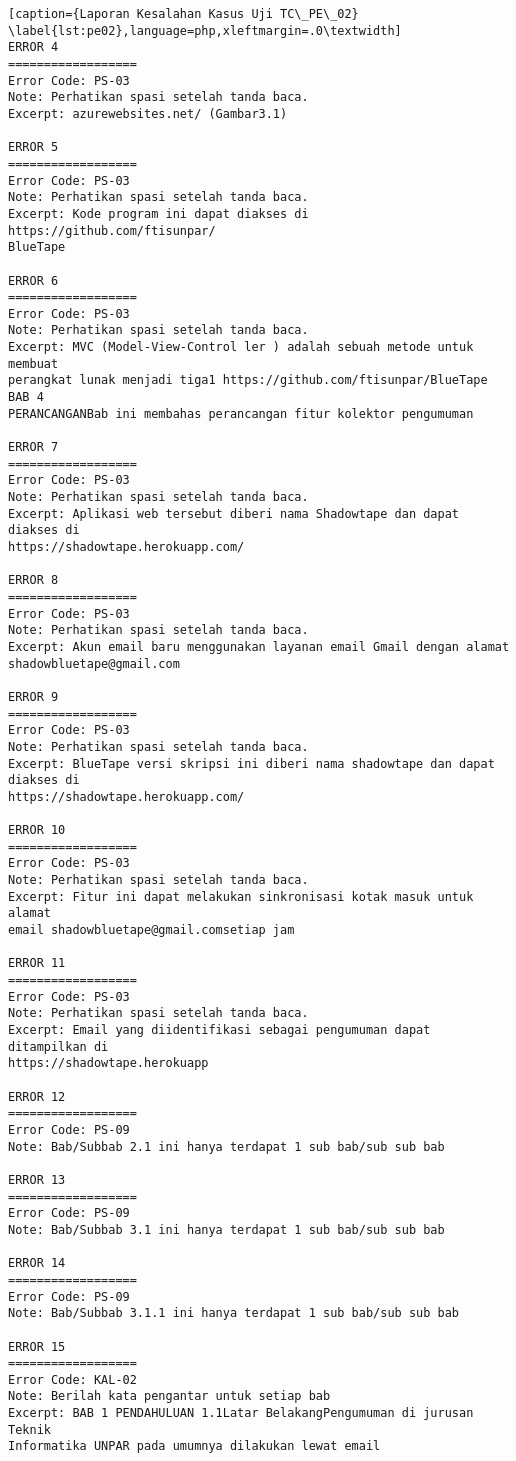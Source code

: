 \begin{enumerate}
\begin{lstlisting}[caption={Laporan Kesalahan Kasus Uji TC\_PE\_02}	\label{lst:pe02},language=php,xleftmargin=.0\textwidth]
ERROR 4
==================
Error Code: PS-03
Note: Perhatikan spasi setelah tanda baca.
Excerpt: azurewebsites.net/ (Gambar3.1)

ERROR 5
==================
Error Code: PS-03
Note: Perhatikan spasi setelah tanda baca.
Excerpt: Kode program ini dapat diakses di https://github.com/ftisunpar/
BlueTape 

ERROR 6
==================
Error Code: PS-03
Note: Perhatikan spasi setelah tanda baca.
Excerpt: MVC (Model-View-Control ler ) adalah sebuah metode untuk membuat 
perangkat lunak menjadi tiga1 https://github.com/ftisunpar/BlueTape BAB 4 
PERANCANGANBab ini membahas perancangan fitur kolektor pengumuman

ERROR 7
==================
Error Code: PS-03
Note: Perhatikan spasi setelah tanda baca.
Excerpt: Aplikasi web tersebut diberi nama Shadowtape dan dapat diakses di 
https://shadowtape.herokuapp.com/ 

ERROR 8
==================
Error Code: PS-03
Note: Perhatikan spasi setelah tanda baca.
Excerpt: Akun email baru menggunakan layanan email Gmail dengan alamat 
shadowbluetape@gmail.com

ERROR 9
==================
Error Code: PS-03
Note: Perhatikan spasi setelah tanda baca.
Excerpt: BlueTape versi skripsi ini diberi nama shadowtape dan dapat diakses di 
https://shadowtape.herokuapp.com/

ERROR 10
==================
Error Code: PS-03
Note: Perhatikan spasi setelah tanda baca.
Excerpt: Fitur ini dapat melakukan sinkronisasi kotak masuk untuk alamat 
email shadowbluetape@gmail.comsetiap jam

ERROR 11
==================
Error Code: PS-03
Note: Perhatikan spasi setelah tanda baca.
Excerpt: Email yang diidentifikasi sebagai pengumuman dapat ditampilkan di 
https://shadowtape.herokuapp

ERROR 12
==================
Error Code: PS-09
Note: Bab/Subbab 2.1 ini hanya terdapat 1 sub bab/sub sub bab

ERROR 13
==================
Error Code: PS-09
Note: Bab/Subbab 3.1 ini hanya terdapat 1 sub bab/sub sub bab

ERROR 14
==================
Error Code: PS-09
Note: Bab/Subbab 3.1.1 ini hanya terdapat 1 sub bab/sub sub bab

ERROR 15
==================
Error Code: KAL-02
Note: Berilah kata pengantar untuk setiap bab
Excerpt: BAB 1 PENDAHULUAN 1.1Latar BelakangPengumuman di jurusan Teknik 
Informatika UNPAR pada umumnya dilakukan lewat email 
\end{lstlisting}
	

\end{enumerate}
